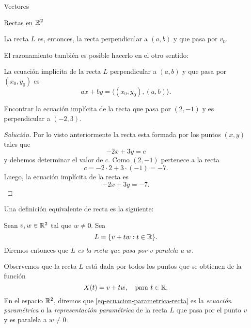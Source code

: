 \begin{chapter}{Vectores}
\begin{section}{Rectas en $\mathbb R^2$}
\begin{observacion*}
    La recta $L$ es, entonces, la recta perpendicular a $(a,b)$ y que pasa por $v_0$. 
    
    \end{observacion*}

    El  razonamiento también es posible hacerlo en el otro sentido: 

    \begin{resultado}\label{res-recta-perp}
        {La ecuación implícita de la recta $L$ perpendicular a $(a,b)$ y que pasa por $(x_0,y_0)$ es
            \begin{equation*}
            ax +by = \langle (x_0,y_0), (a,b) \rangle.
            \end{equation*}}
    \end{resultado}

\begin{ejemplo*}
    Encontrar la ecuación implícita de la recta que pasa por $(2,-1)$ y  es perpendicular a $(-2,3)$.
\end{ejemplo*}
\begin{proof}[Solución]
Por lo visto anteriormente la recta esta formada por los puntos  $(x,y)$ tales que
    \begin{equation*}
            -2x+3y = c
    \end{equation*}
     y debemos determinar el valor de $c$. Como $(2,-1)$ pertenece a la recta
     \begin{equation*}
     c = -2\cdot 2+3\cdot (-1) = -7.
     \end{equation*}
     Luego, la ecuación implícita de la recta es
     \begin{equation*}
     -2x+3y = -7.
     \end{equation*}
\end{proof}


    Una definición equivalente de recta es la siguiente:
    
        \begin{definicion}
            Sean $v, w \in \mathbb R^2$ tal que  $w \not=0$. Sea 
            \begin{equation*}
            L = \{v + tw: t \in \mathbb R\}. 
            \end{equation*}
            Diremos entonces que  \textit{$L$ es la recta que pasa por $v$ paralela a $w$.} 
        \end{definicion}
        
    Observemos que la recta $L$ está dada por todos los puntos que se obtienen de la función
    \begin{equation}\label{eq-ecuacion-parametrica-recta}
    X(t) =v +tw, \quad \text{para $t \in \mathbb R$.} 
    \end{equation} 
    En  el espacio $\mathbb R^2$, diremos que \eqref{eq-ecuacion-parametrica-recta} es la \textit{ecuación paramétrica} o la \textit{representación paramétrica} de la recta $L$ que pasa por el punto $v$ y es paralela a $w \ne 0$.
        




\end{section}
\end{chapter}
